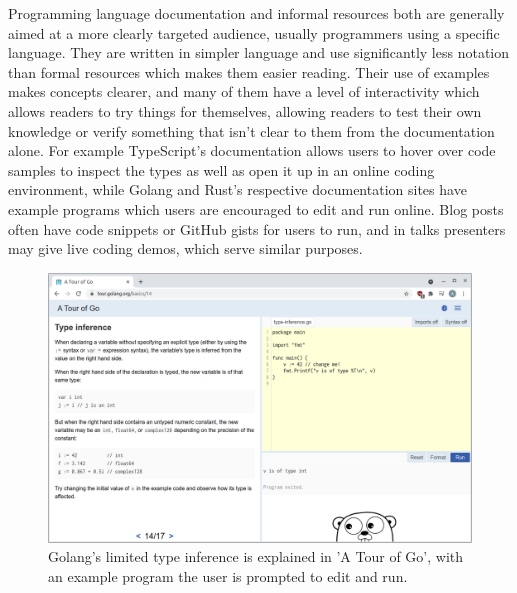 \documentclass[a4paper,fleqn,oneside,12pt]{report}
\begin{document}
Programming language documentation and informal resources both are generally aimed at a more clearly targeted audience, usually programmers using a specific language. They are written in simpler language and use significantly less notation than formal resources which makes them easier reading. Their use of examples makes concepts clearer, and many of them have a level of interactivity which allows readers to try things for themselves, allowing readers to test their own knowledge or verify something that isn’t clear to them from the documentation alone. For example TypeScript's documentation allows users to hover over code samples to inspect the types as well as open it up in an online coding environment, while Golang and Rust's respective documentation sites have example programs which users are encouraged to edit and run online. Blog posts often have code snippets or GitHub gists for users to run, and in talks presenters may give live coding demos, which serve similar purposes.

\begin{figure}[h!]
  \centering
  \includegraphics[width=1.000\linewidth]{images/image5.png}
  \caption{Golang's limited type inference is explained in 'A Tour of Go', with an example program the user is prompted to edit and run.}
\end{figure}
\end{document}
